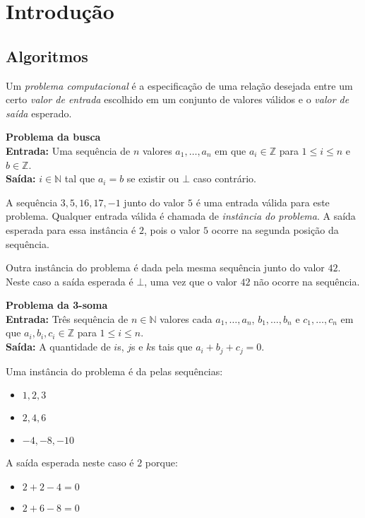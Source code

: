 \chapter{Introdução}

\section{Algoritmos}

Um {\em problema computacional} é a especificação de uma relação desejada entre um certo {\em valor de entrada} escolhido em um conjunto de valores válidos e o {\em valor de saída} esperado.

\begin{example}
  {\bf Problema da busca}\\

  {\bf Entrada:} Uma sequência de $n$ valores $a_1, \dots, a_n$ em que $a_i \in \mathbb{Z}$ para $1 \leq i \leq n$ e $b \in \mathbb{Z}$.\\

  {\bf Saída:} $i \in \mathbb{N}$ tal que $a_i = b$ se existir ou $\bot$ caso contrário.


  A sequência $3, 5, 16, 17, -1$ junto do valor $5$ é uma entrada válida para este problema.
  Qualquer entrada válida é chamada de {\em instância do problema}.
  A saída esperada para essa instância é $2$, pois o valor $5$ ocorre na segunda posição da sequência.

  Outra instância do problema é dada pela mesma sequência junto do valor $42$.
  Neste caso a saída esperada é $\bot$, uma vez que o valor $42$ não ocorre na sequência.
\end{example}

\begin{example}
  {\bf Problema da 3-soma}\\

  {\bf Entrada:} Três sequência de $n \in \mathbb{N}$ valores cada $ a_1, \dots, a_n$,  $b_1, \dots, b_n$ e $c_1, \dots, c_n$ em que $a_i, b_i, c_i \in \mathbb{Z}$ para $1 \leq i \leq n$.\\

  {\bf Saída:} A quantidade de $i$s, $j$s e $k$s tais que $a_i + b_j + c_j = 0$.

  Uma instância do problema é da pelas sequências:
  \begin{itemize}
  \item[] $1, 2, 3$
  \item[] $2, 4, 6$
  \item[] $-4, -8, -10$
  \end{itemize}

  A saída esperada neste caso é $2$ porque:
  \begin{itemize}
  \item[] $2 + 2 - 4 = 0$
  \item[] $2 + 6 - 8 = 0$
  \end{itemize}
\end{example}

